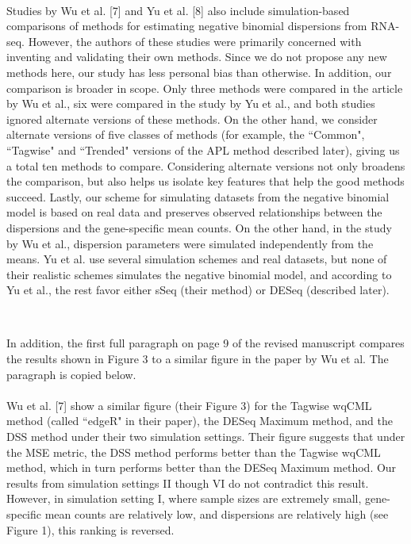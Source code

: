 \documentclass{article}
\providecommand{\q}{$\quad$ \newline}
\begin{document}
\begin{flushleft}
\begin{enumerate}
{\color{blue} \paragraph{} \indent Studies by Wu et al. [7] and Yu et al. [8] also include simulation-based comparisons of methods for estimating negative binomial dispersions from RNA-seq. However, the authors of these studies were primarily concerned with inventing and validating their own methods. Since we do not propose any new methods here, our study has less personal bias than otherwise. In addition, our comparison is broader in scope. Only three methods were compared in the article by Wu et al., six were compared in the study by Yu et al., and both studies ignored alternate versions of these methods. On the other hand, we consider alternate versions of five classes of methods (for example, the ``Common", ``Tagwise" and ``Trended" versions of the APL method described later), giving us a total ten methods to compare. Considering alternate versions not only broadens the comparison, but also helps us isolate key features that help the good methods succeed. Lastly, our scheme for simulating datasets from the negative binomial model is based on real data and preserves observed relationships between the dispersions and the gene-specific mean counts. On the other hand, in the study by Wu et al., dispersion parameters were simulated independently from the means. Yu et al. use several simulation schemes and real datasets, but none of their realistic schemes simulates the negative binomial model, and according to Yu et al., the rest favor either sSeq (their method) or DESeq (described later).} \q

In addition, the first full paragraph on page 9 of the revised manuscript compares the results shown in Figure 3 to a similar figure in the paper by Wu et al. The paragraph is copied below.

{\color{blue}\paragraph{} \indent Wu et al. [7] show a similar figure (their Figure 3) for the Tagwise wqCML method (called ``edgeR" in their paper), the DESeq Maximum method, and the DSS method under their two simulation settings. Their figure suggests that under the MSE metric, the DSS method performs better than the Tagwise wqCML method, which in turn performs better than the DESeq Maximum method. Our results from simulation settings II though VI do not contradict this result. However, in simulation setting I, where sample sizes are extremely small, gene-specific mean counts are relatively low, and dispersions are relatively high (see Figure 1), this ranking is reversed.} \q



\end{enumerate}
\end{flushleft}
\end{document}
